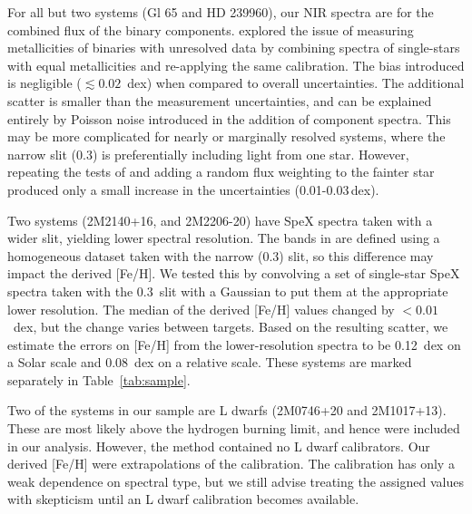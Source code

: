 \documentclass[twocolumn]{aastex62}
\begin{document}
For all but two systems (Gl 65 and HD 239960), our NIR spectra are for the combined flux of the binary components. \citet{Mann2014} explored the issue of measuring metallicities of binaries with unresolved data by combining spectra of single-stars with equal metallicities and re-applying the same calibration. The bias introduced is negligible ($\lesssim0.02$~dex) when compared to overall uncertainties. The additional scatter is smaller than the measurement uncertainties, and can be explained entirely by Poisson noise introduced in the addition of component spectra. This may be more complicated for nearly or marginally resolved systems, where the narrow slit (0.3\arcsec) is preferentially including light from one star. However, repeating the tests of \citet{Mann2014} and adding a random flux weighting to the fainter star produced only a small increase in the uncertainties (0.01-0.03\,dex).

Two systems (2M2140+16, and 2M2206-20) have SpeX spectra taken with a wider slit, yielding lower spectral resolution. The bands in \citet{Mann2014} are defined using a homogeneous dataset taken with the narrow (0.3\arcsec) slit, so this difference may impact the derived [Fe/H]. We tested this by convolving a set of single-star SpeX spectra taken with the 0.3\arcsec\ slit with a Gaussian to put them at the appropriate lower resolution. The median of the derived [Fe/H] values changed by $<0.01$~dex, but the change varies between targets. Based on the resulting scatter, we estimate the errors on [Fe/H] from the lower-resolution spectra to be 0.12~dex on a Solar scale and 0.08~dex on a relative scale. These systems are marked separately in Table~\ref{tab:sample}. 

Two of the systems in our sample are L dwarfs (2M0746+20 and 2M1017+13). These are most likely above the hydrogen burning limit, and hence were included in our analysis. However, the \citet{Mann2014} method contained no L dwarf calibrators. Our derived [Fe/H] were extrapolations of the \citet{Mann2014} calibration. The \citet{Mann2014} calibration has only a weak dependence on spectral type, but we still advise treating the assigned values with skepticism until an L dwarf calibration becomes available. 
\end{document}
